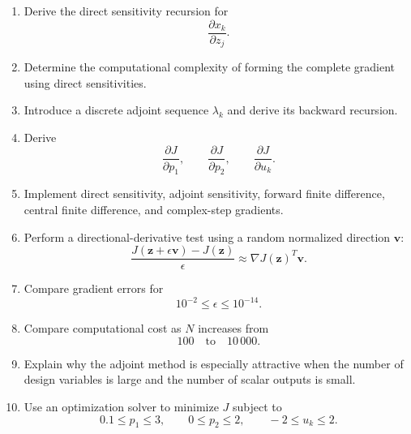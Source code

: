 \begin{enumerate}
    \item Derive the direct sensitivity recursion for
    \begin{equation}
    \frac{\partial x_k}{\partial z_j}.
    \end{equation}

    \item Determine the computational complexity of forming the complete
    gradient using direct sensitivities.

    \item Introduce a discrete adjoint sequence $\lambda_k$ and derive its
    backward recursion.

    \item Derive
    \begin{equation}
    \frac{\partial J}{\partial p_1},
    \qquad
    \frac{\partial J}{\partial p_2},
    \qquad
    \frac{\partial J}{\partial u_k}.
    \end{equation}

    \item Implement direct sensitivity, adjoint sensitivity, forward finite
    difference, central finite difference, and complex-step gradients.

    \item Perform a directional-derivative test using a random normalized
    direction $\mathbf{v}$:
    \begin{equation}
    \frac{
    J(\mathbf{z}+\epsilon\mathbf{v})
    -
    J(\mathbf{z})
    }{\epsilon}
    \approx
    \nabla J(\mathbf{z})^T\mathbf{v}.
    \end{equation}

    \item Compare gradient errors for
    \begin{equation}
    10^{-2}\leq\epsilon\leq10^{-14}.
    \end{equation}

    \item Compare computational cost as $N$ increases from
    \begin{equation}
    100
    \quad\text{to}\quad
    10\,000.
    \end{equation}

    \item Explain why the adjoint method is especially attractive when the
    number of design variables is large and the number of scalar outputs is
    small.

    \item Use an optimization solver to minimize $J$ subject to
    \begin{equation}
    0.1\leq p_1\leq3,
    \qquad
    0\leq p_2\leq2,
    \qquad
    -2\leq u_k\leq2.
    \end{equation}
\end{enumerate}


